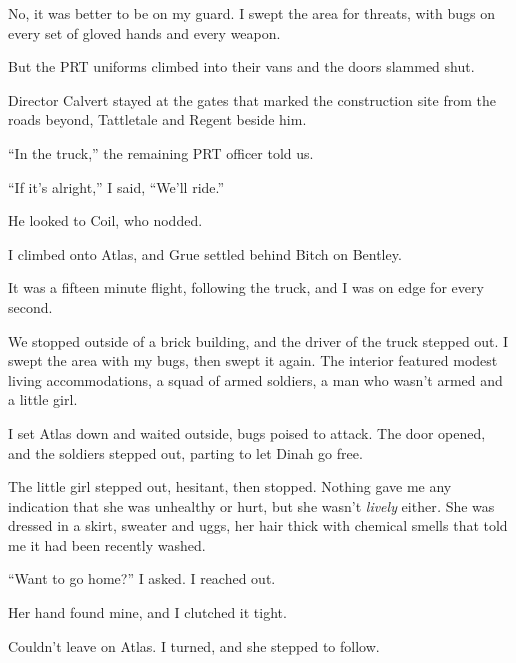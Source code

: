 No, it was better to be on my guard.  I swept the area for threats, with bugs on every set of gloved hands and every weapon.



But the PRT uniforms climbed into their vans and the doors slammed shut.



Director Calvert stayed at the gates that marked the construction site from the roads beyond, Tattletale and Regent beside him.



``In the truck,'' the remaining PRT officer told us.



``If it's alright,'' I said, ``We'll ride.''



He looked to Coil, who nodded.



I climbed onto Atlas, and Grue settled behind Bitch on Bentley.



It was a fifteen minute flight, following the truck, and I was on edge for every second.



We stopped outside of a brick building, and the driver of the truck stepped out.  I swept the area with my bugs, then swept it again.  The interior featured modest living accommodations, a squad of armed soldiers, a man who wasn't armed and a little girl.



I set Atlas down and waited outside, bugs poised to attack.  The door opened, and the soldiers stepped out, parting to let Dinah go free.



The little girl stepped out, hesitant, then stopped.  Nothing gave me any indication that she was unhealthy or hurt, but she wasn't \emph{lively }either\emph{.  }She was dressed in a skirt, sweater and uggs, her hair thick with chemical smells that told me it had been recently washed.



``Want to go home?'' I asked.  I reached out.



Her hand found mine, and I clutched it tight.



Couldn't leave on Atlas.  I turned, and she stepped to follow.



